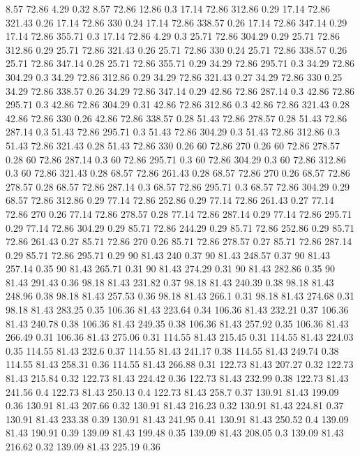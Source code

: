 8.57	72.86	4.29	0.32
8.57	72.86	12.86	0.3
17.14	72.86	312.86	0.29
17.14	72.86	321.43	0.26
17.14	72.86	330	0.24
17.14	72.86	338.57	0.26
17.14	72.86	347.14	0.29
17.14	72.86	355.71	0.3
17.14	72.86	4.29	0.3
25.71	72.86	304.29	0.29
25.71	72.86	312.86	0.29
25.71	72.86	321.43	0.26
25.71	72.86	330	0.24
25.71	72.86	338.57	0.26
25.71	72.86	347.14	0.28
25.71	72.86	355.71	0.29
34.29	72.86	295.71	0.3
34.29	72.86	304.29	0.3
34.29	72.86	312.86	0.29
34.29	72.86	321.43	0.27
34.29	72.86	330	0.25
34.29	72.86	338.57	0.26
34.29	72.86	347.14	0.29
42.86	72.86	287.14	0.3
42.86	72.86	295.71	0.3
42.86	72.86	304.29	0.31
42.86	72.86	312.86	0.3
42.86	72.86	321.43	0.28
42.86	72.86	330	0.26
42.86	72.86	338.57	0.28
51.43	72.86	278.57	0.28
51.43	72.86	287.14	0.3
51.43	72.86	295.71	0.3
51.43	72.86	304.29	0.3
51.43	72.86	312.86	0.3
51.43	72.86	321.43	0.28
51.43	72.86	330	0.26
60	72.86	270	0.26
60	72.86	278.57	0.28
60	72.86	287.14	0.3
60	72.86	295.71	0.3
60	72.86	304.29	0.3
60	72.86	312.86	0.3
60	72.86	321.43	0.28
68.57	72.86	261.43	0.28
68.57	72.86	270	0.26
68.57	72.86	278.57	0.28
68.57	72.86	287.14	0.3
68.57	72.86	295.71	0.3
68.57	72.86	304.29	0.29
68.57	72.86	312.86	0.29
77.14	72.86	252.86	0.29
77.14	72.86	261.43	0.27
77.14	72.86	270	0.26
77.14	72.86	278.57	0.28
77.14	72.86	287.14	0.29
77.14	72.86	295.71	0.29
77.14	72.86	304.29	0.29
85.71	72.86	244.29	0.29
85.71	72.86	252.86	0.29
85.71	72.86	261.43	0.27
85.71	72.86	270	0.26
85.71	72.86	278.57	0.27
85.71	72.86	287.14	0.29
85.71	72.86	295.71	0.29
90	81.43	240	0.37
90	81.43	248.57	0.37
90	81.43	257.14	0.35
90	81.43	265.71	0.31
90	81.43	274.29	0.31
90	81.43	282.86	0.35
90	81.43	291.43	0.36
98.18	81.43	231.82	0.37
98.18	81.43	240.39	0.38
98.18	81.43	248.96	0.38
98.18	81.43	257.53	0.36
98.18	81.43	266.1	0.31
98.18	81.43	274.68	0.31
98.18	81.43	283.25	0.35
106.36	81.43	223.64	0.34
106.36	81.43	232.21	0.37
106.36	81.43	240.78	0.38
106.36	81.43	249.35	0.38
106.36	81.43	257.92	0.35
106.36	81.43	266.49	0.31
106.36	81.43	275.06	0.31
114.55	81.43	215.45	0.31
114.55	81.43	224.03	0.35
114.55	81.43	232.6	0.37
114.55	81.43	241.17	0.38
114.55	81.43	249.74	0.38
114.55	81.43	258.31	0.36
114.55	81.43	266.88	0.31
122.73	81.43	207.27	0.32
122.73	81.43	215.84	0.32
122.73	81.43	224.42	0.36
122.73	81.43	232.99	0.38
122.73	81.43	241.56	0.4
122.73	81.43	250.13	0.4
122.73	81.43	258.7	0.37
130.91	81.43	199.09	0.36
130.91	81.43	207.66	0.32
130.91	81.43	216.23	0.32
130.91	81.43	224.81	0.37
130.91	81.43	233.38	0.39
130.91	81.43	241.95	0.41
130.91	81.43	250.52	0.4
139.09	81.43	190.91	0.39
139.09	81.43	199.48	0.35
139.09	81.43	208.05	0.3
139.09	81.43	216.62	0.32
139.09	81.43	225.19	0.36

